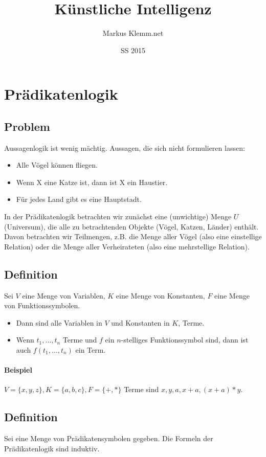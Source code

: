 \documentclass[a4paper]{scrartcl}
\title{Künstliche Intelligenz}
\date{SS 2015}
\author{Markus Klemm.net}
\begin{document}
\maketitle
\tableofcontents


\section{Prädikatenlogik}
\subsection{Problem} Aussagenlogik ist wenig mächtig. Aussagen, die sich nicht formulieren lassen:
\begin{itemize}
\item Alle Vögel können fliegen.
\item Wenn X eine Katze ist, dann ist X ein Haustier.
\item Für jedes Land gibt es eine Hauptstadt.
\end{itemize}
In der Prädikatenlogik betrachten wir zunächst eine (unwichtige) Menge $U$ (Universum), die alle zu betrachtenden Objekte (Vögel, Katzen, Länder) enthält.
Davon betrachten wir Teilmengen, z.B. die Menge aller Vögel (also eine einstellige Relation) oder die Menge aller Verheirateten (also eine mehrstellige Relation).
\subsection{Definition}
Sei $V$ eine Menge von Variablen, $K$ eine Menge von Konstanten, $F$ eine Menge von Funktionssymbolen.
\begin{itemize}
\item Dann sind alle Variablen in $V$ und Konstanten in $K$, Terme.
\item Wenn $t_1,\dots,t_n$ Terme und $f$ ein $n$-stelliges Funktionssymbol sind, dann ist auch $f(t_1,\dots,t_n)$ ein Term.
\end{itemize}
\paragraph{Beispiel} $V=\{x,y,z\},K=\{a,b,c\},F=\{+,*\}$ Terme sind $x,y,a,x+a,(x+a)*y$.

\subsection{Definition} Sei eine Menge von Prädikatensymbolen gegeben. Die Formeln der Prädikatenlogik sind induktiv.
\end{document}
